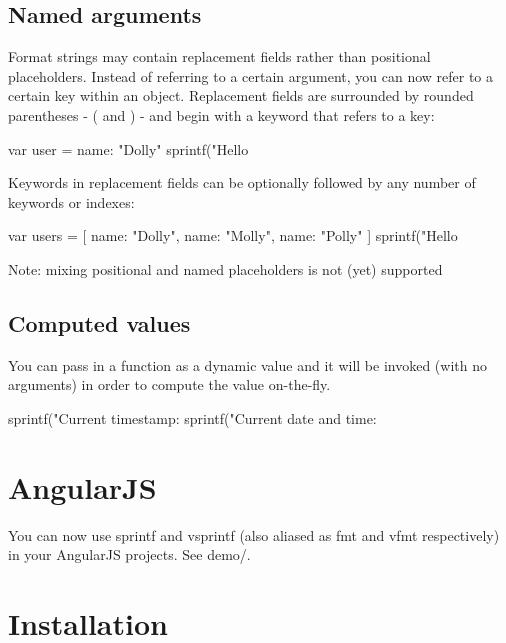 \subsection*{Named arguments}

Format strings may contain replacement fields rather than positional placeholders. Instead of referring to a certain argument, you can now refer to a certain key within an object. Replacement fields are surrounded by rounded parentheses -\/ {\ttfamily (} and {\ttfamily )} -\/ and begin with a keyword that refers to a key\+: \begin{DoxyVerb}var user = {
    name: "Dolly"
}
sprintf("Hello %
\end{DoxyVerb}
 Keywords in replacement fields can be optionally followed by any number of keywords or indexes\+: \begin{DoxyVerb}var users = [
    {name: "Dolly"},
    {name: "Molly"},
    {name: "Polly"}
]
sprintf("Hello %
\end{DoxyVerb}
 Note\+: mixing positional and named placeholders is not (yet) supported

\subsection*{Computed values}

You can pass in a function as a dynamic value and it will be invoked (with no arguments) in order to compute the value on-\/the-\/fly. \begin{DoxyVerb}sprintf("Current timestamp: %
sprintf("Current date and time: %
\end{DoxyVerb}


\section*{Angular\+JS}

You can now use {\ttfamily sprintf} and {\ttfamily vsprintf} (also aliased as {\ttfamily fmt} and {\ttfamily vfmt} respectively) in your Angular\+JS projects. See {\ttfamily demo/}.

\section*{Installation}

